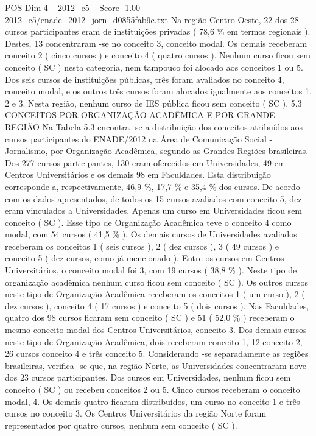 \begin{textsample}{POS Dim 4 – 2012\_c5 – Score -1.00 – 2012\_c5/enade\_2012\_jorn\_d0855fab9c.txt}
Na região Centro-Oeste, 22 dos 28 cursos participantes eram de instituições privadas ( 78,6 \% em termos regionais ).
Destes, 13 concentraram -se no conceito 3, conceito modal.
Os demais receberam conceito 2 ( cinco cursos ) e conceito 4 ( quatro cursos ).
Nenhum curso ficou sem conceito ( SC ) nesta categoria, nem tampouco foi alocado aos conceitos 1 ou 5.
Dos seis cursos de instituições públicas, três foram avaliados no conceito 4, conceito modal, e os outros três cursos foram alocados igualmente aos conceitos 1, 2 e 3.
Nesta região, nenhum curso de IES pública ficou sem conceito ( SC ). 5.3 CONCEITOS POR ORGANIZAÇÃO ACADÊMICA E POR GRANDE REGIÃO Na Tabela 5.3 encontra -se a distribuição dos conceitos atribuídos aos cursos participantes do ENADE/2012 na Área de Comunicação Social - Jornalismo, por Organização Acadêmica, segundo as Grandes Regiões brasileiras.
Dos 277 cursos participantes, 130 eram oferecidos em Universidades, 49 em Centros Universitários e os demais 98 em Faculdades.
Esta distribuição corresponde a, respectivamente, 46,9 \%, 17,7 \% e 35,4 \% dos cursos.
De acordo com os dados apresentados, de todos os 15 cursos avaliados com conceito 5, dez eram vinculados a Universidades.
Apenas um curso em Universidades ficou sem conceito ( SC ).
Esse tipo de Organização Acadêmica teve o conceito 4 como modal, com 54 cursos ( 41,5 \% ).
Os demais cursos de Universidades avaliados receberam os conceitos 1 ( seis cursos ), 2 ( dez cursos ), 3 ( 49 cursos ) e conceito 5 ( dez cursos, como já mencionado ).
Entre os cursos em Centros Universitários, o conceito modal foi 3, com 19 cursos ( 38,8 \% ).
Neste tipo de organização acadêmica nenhum curso ficou sem conceito ( SC ).
Os outros cursos neste tipo de Organização Acadêmica receberam os conceitos 1 ( um curso ), 2 ( dez cursos ), conceito 4 ( 17 cursos ) e conceito 5 ( dois cursos ).
Nas Faculdades, quatro dos 98 cursos ficaram sem conceito ( SC ) e 51 ( 52,0 \% ) receberam o mesmo conceito modal dos Centros Universitários, conceito 3.
Dos demais cursos neste tipo de Organização Acadêmica, dois receberam conceito 1, 12 conceito 2, 26 cursos conceito 4 e três conceito 5.
Considerando -se separadamente as regiões brasileiras, verifica -se que, na região Norte, as Universidades concentraram nove dos 23 cursos participantes.
Dos cursos em Universidades, nenhum ficou sem conceito ( SC ) ou recebeu conceitos 2 ou 5.
Cinco cursos receberam o conceito modal, 4.
Os demais quatro ficaram distribuídos, um curso no conceito 1 e três cursos no conceito 3.
Os Centros Universitários da região Norte foram representados por quatro cursos, nenhum sem conceito ( SC ).

\end{textsample}

